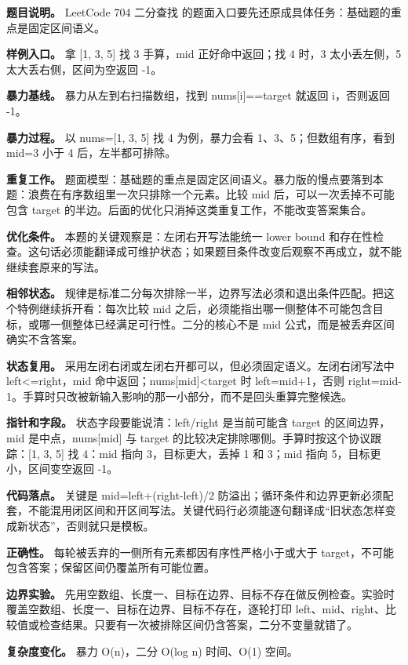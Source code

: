 \textbf{题目说明。} LeetCode 704 二分查找 的题面入口要先还原成具体任务：基础题的重点是固定区间语义。

\textbf{样例入口。} 拿 [1, 3, 5] 找 3 手算，mid 正好命中返回；找 4 时，3 太小丢左侧，5 太大丢右侧，区间为空返回 -1。

\textbf{暴力基线。} 暴力从左到右扫描数组，找到 nums[i]==target 就返回 i，否则返回 -1。

\textbf{暴力过程。} 以 nums=[1, 3, 5] 找 4 为例，暴力会看 1、3、5；但数组有序，看到 mid=3 小于 4 后，左半都可排除。

\textbf{重复工作。} 题面模型：基础题的重点是固定区间语义。暴力版的慢点要落到本题：浪费在有序数组里一次只排除一个元素。比较 mid 后，可以一次丢掉不可能包含 target 的半边。后面的优化只消掉这类重复工作，不能改变答案集合。

\textbf{优化条件。} 本题的关键观察是：左闭右开写法能统一 lower bound 和存在性检查。这句话必须能翻译成可维护状态；如果题目条件改变后观察不再成立，就不能继续套原来的写法。

\textbf{相邻状态。} 规律是标准二分每次排除一半，边界写法必须和退出条件匹配。把这个特例继续拆开看：每次比较 mid 之后，必须能指出哪一侧整体不可能包含目标，或哪一侧整体已经满足可行性。二分的核心不是 mid 公式，而是被丢弃区间确实不含答案。

\textbf{状态复用。} 采用左闭右闭或左闭右开都可以，但必须固定语义。左闭右闭写法中 left<=right，mid 命中返回；nums[mid]<target 时 left=mid+1，否则 right=mid-1。手算时只改被新输入影响的那一小部分，而不是回头重算完整候选。

\textbf{指针和字段。} 状态字段要能说清：left/right 是当前可能含 target 的区间边界，mid 是中点，nums[mid] 与 target 的比较决定排除哪侧。手算时按这个协议跟踪：[1, 3, 5] 找 4：mid 指向 3，目标更大，丢掉 1 和 3；mid 指向 5，目标更小，区间变空返回 -1。

\textbf{代码落点。} 关键是 mid=left+(right-left)/2 防溢出；循环条件和边界更新必须配套，不能混用闭区间和开区间写法。关键代码行必须能逐句翻译成“旧状态怎样变成新状态”，否则就只是模板。

\textbf{正确性。} 每轮被丢弃的一侧所有元素都因有序性严格小于或大于 target，不可能包含答案；保留区间仍覆盖所有可能位置。

\textbf{边界实验。} 先用空数组、长度一、目标在边界、目标不存在做反例检查。实验时覆盖空数组、长度一、目标在边界、目标不存在，逐轮打印 left、mid、right、比较值或检查结果。只要有一次被排除区间仍含答案，二分不变量就错了。

\textbf{复杂度变化。} 暴力 O(n)，二分 O(log n) 时间、O(1) 空间。

